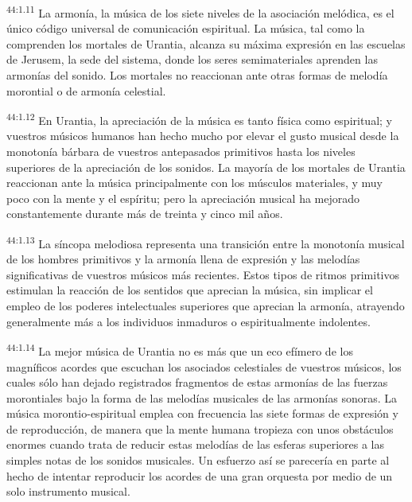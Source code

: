 \par
\textsuperscript{44:1.11} La armonía, la música de los siete niveles de la asociación melódica, es el único código universal de comunicación espiritual. La música, tal como la comprenden los mortales de Urantia, alcanza su máxima expresión en las escuelas de Jerusem, la sede del sistema, donde los seres semimateriales aprenden las armonías del sonido. Los mortales no reaccionan ante otras formas de melodía morontial o de armonía celestial.

\par
\textsuperscript{44:1.12} En Urantia, la apreciación de la música es tanto física como espiritual; y vuestros músicos humanos han hecho mucho por elevar el gusto musical desde la monotonía bárbara de vuestros antepasados primitivos hasta los niveles superiores de la apreciación de los sonidos. La mayoría de los mortales de Urantia reaccionan ante la música principalmente con los músculos materiales, y muy poco con la mente y el espíritu; pero la apreciación musical ha mejorado constantemente durante más de treinta y cinco mil años.

\par
\textsuperscript{44:1.13} La síncopa melodiosa representa una transición entre la monotonía musical de los hombres primitivos y la armonía llena de expresión y las melodías significativas de vuestros músicos más recientes. Estos tipos de ritmos primitivos estimulan la reacción de los sentidos que aprecian la música, sin implicar el empleo de los poderes intelectuales superiores que aprecian la armonía, atrayendo generalmente más a los individuos inmaduros o espiritualmente indolentes.

\par
\textsuperscript{44:1.14} La mejor música de Urantia no es más que un eco efímero de los magníficos acordes que escuchan los asociados celestiales de vuestros músicos, los cuales sólo han dejado registrados fragmentos de estas armonías de las fuerzas morontiales bajo la forma de las melodías musicales de las armonías sonoras. La música morontio-espiritual emplea con frecuencia las siete formas de expresión y de reproducción, de manera que la mente humana tropieza con unos obstáculos enormes cuando trata de reducir estas melodías de las esferas superiores a las simples notas de los sonidos musicales. Un esfuerzo así se parecería en parte al hecho de intentar reproducir los acordes de una gran orquesta por medio de un solo instrumento musical.

